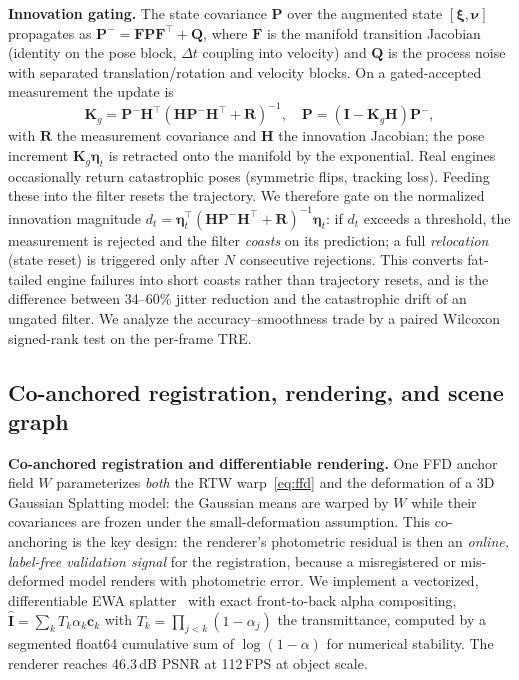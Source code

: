 \documentclass[9pt,twoside,web]{ieeecolor2}
\begin{document}
\textbf{Innovation gating.} The state covariance $\mathbf{P}$ over the augmented state $[\boldsymbol{\xi},\boldsymbol{\nu}]$ propagates as $\mathbf{P}^{-}=\mathbf{F}\mathbf{P}\mathbf{F}^{\top}+\mathbf{Q}$, where $\mathbf{F}$ is the manifold transition Jacobian (identity on the pose block, $\Delta t$ coupling into velocity) and $\mathbf{Q}$ is the process noise with separated translation/rotation and velocity blocks. On a gated-accepted measurement the update is
\begin{equation}\label{eq:kalmanupdate}
\mathbf{K}_{g}=\mathbf{P}^{-}\mathbf{H}^{\top}(\mathbf{H}\mathbf{P}^{-}\mathbf{H}^{\top}+\mathbf{R})^{-1},\quad
\mathbf{P}=(\mathbf{I}-\mathbf{K}_{g}\mathbf{H})\mathbf{P}^{-},
\end{equation}
with $\mathbf{R}$ the measurement covariance and $\mathbf{H}$ the innovation Jacobian; the pose increment $\mathbf{K}_{g}\boldsymbol{\eta}_{t}$ is retracted onto the manifold by the exponential. Real engines occasionally return catastrophic poses (symmetric flips, tracking loss). Feeding these into the filter resets the trajectory. We therefore gate on the normalized innovation magnitude $d_{t}=\boldsymbol{\eta}_{t}^{\top}(\mathbf{H}\mathbf{P}^{-}\mathbf{H}^{\top}+\mathbf{R})^{-1}\boldsymbol{\eta}_{t}$: if $d_{t}$ exceeds a threshold, the measurement is rejected and the filter \emph{coasts} on its prediction; a full \emph{relocation} (state reset) is triggered only after $N$ consecutive rejections. This converts fat-tailed engine failures into short coasts rather than trajectory resets, and is the difference between 34--60\% jitter reduction and the catastrophic drift of an ungated filter. We analyze the accuracy--smoothness trade by a paired Wilcoxon signed-rank test on the per-frame TRE.

\subsection{Co-anchored registration, rendering, and scene graph}\label{sec:render}

\textbf{Co-anchored registration and differentiable rendering.} One FFD anchor field $W$ parameterizes \emph{both} the RTW warp~\eqref{eq:ffd} and the deformation of a 3D Gaussian Splatting model: the Gaussian means are warped by $W$ while their covariances are frozen under the small-deformation assumption. This co-anchoring is the key design: the renderer's photometric residual is then an \emph{online, label-free validation signal} for the registration, because a misregistered or mis-deformed model renders with photometric error. We implement a vectorized, differentiable EWA splatter~\cite{kerbl20233dgs} with exact front-to-back alpha compositing, $\hat{\mathbf{I}}=\sum_{k}T_{k}\alpha_{k}\mathbf{c}_{k}$ with $T_{k}=\prod_{j<k}(1-\alpha_{j})$ the transmittance, computed by a segmented float64 cumulative sum of $\log(1-\alpha)$ for numerical stability. The renderer reaches 46.3\,dB PSNR at 112\,FPS at object scale.
\end{document}
